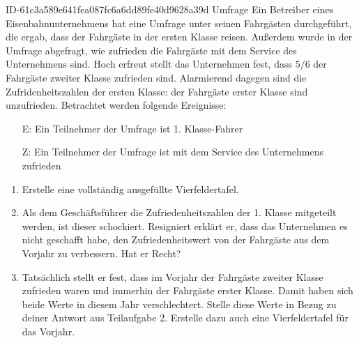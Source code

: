 \begin{exercise}
      {ID-61c3a589e641fea087fc6a6dd89fe40d9628a39d}
      {Umfrage}
  \ifproblem\problem
    Ein Betreiber eines Eisenbahnunternehmens hat eine Umfrage unter
    seinen Fahrgästen durchgeführt, die ergab, dass  der Fahrgäste
    in der ersten Klasse reisen. Außerdem wurde in der Umfrage abgefragt,
    wie zufrieden die Fahrgäste mit dem Service des Unternehmens sind.
    Hoch erfreut stellt das Unternehmen fest, dass $5/6$ der Fahrgäste
    zweiter Klasse zufrieden sind. Alarmierend dagegen sind die
    Zufridenheitszahlen der ersten Klasse:  der Fahrgäste erster
    Klasse sind unzufrieden. Betrachtet werden folgende Ereignisse:
    \begin{itemize}
      \item[E:] \glqq Ein Teilnehmer der Umfrage ist 1. Klasse-Fahrer\grqq
      \item[Z:] \glqq Ein Teilnehmer der Umfrage ist mit dem Service
                des Unternehmens zufrieden\grqq
    \end{itemize}
    \begin{enumerate}
      \item Erstelle eine vollständig ausgefüllte Vierfeldertafel.
      \item Als dem Geschäftsführer die Zufriedenheitszahlen der 1. Klasse
            mitgeteilt werden, ist dieser schockiert. Resigniert erklärt er,
            dass das Unternehmen es nicht geschafft habe, den Zufriedenheitswert
            von  der Fahrgäste aus dem Vorjahr zu verbessern.
            Hat er Recht?
      \item Tatsächlich stellt er fest, dass im Vorjahr  der Fahrgäste
            zweiter Klasse zufrieden waren und immerhin  der Fahrgäste
            erster Klasse. Damit haben sich beide Werte in diesem Jahr
            verschlechtert. Stelle diese Werte in Bezug zu deiner Antwort aus
            Teilaufgabe 2. Erstelle dazu auch eine Vierfeldertafel für das Vorjahr.
    \end{enumerate}
  \fi
\end{exercise}
